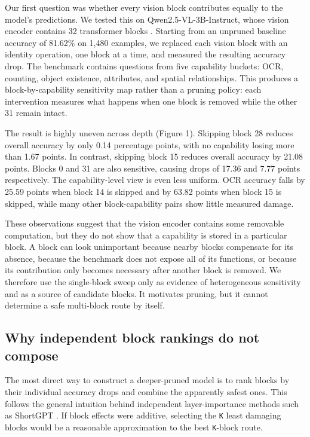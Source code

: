 \documentclass[10pt]{article}
\begin{document}
Our first question was whether every vision block contributes equally to
the model's predictions. We tested this on Qwen2.5-VL-3B-Instruct, whose
vision encoder contains 32 transformer blocks \citep{bai2025qwen25vl}.
Starting from an unpruned baseline accuracy of 81.62\% on 1,480
examples, we replaced each vision block with an identity operation, one
block at a time, and measured the resulting accuracy drop. The benchmark
contains questions from five capability buckets: OCR, counting, object
existence, attributes, and spatial relationships. This produces a
block-by-capability sensitivity map rather than a pruning policy: each
intervention measures what happens when one block is removed while the
other 31 remain intact.

The result is highly uneven across depth (Figure 1). Skipping block 28
reduces overall accuracy by only 0.14 percentage points, with no
capability losing more than 1.67 points. In contrast, skipping block 15
reduces overall accuracy by 21.08 points. Blocks 0 and 31 are also
sensitive, causing drops of 17.36 and 7.77 points respectively. The
capability-level view is even less uniform. OCR accuracy falls by 25.59
points when block 14 is skipped and by 63.82 points when block 15 is
skipped, while many other block-capability pairs show little measured
damage.

These observations suggest that the vision encoder contains some
removable computation, but they do not show that a capability is stored
in a particular block. A block can look unimportant because nearby
blocks compensate for its absence, because the benchmark does not expose
all of its functions, or because its contribution only becomes necessary
after another block is removed. We therefore use the single-block sweep
only as evidence of heterogeneous sensitivity and as a source of
candidate blocks. It motivates pruning, but it cannot determine a safe
multi-block route by itself.

\subsection{Why independent block rankings do not compose}\label{why-independent-block-rankings-do-not-compose}

The most direct way to construct a deeper-pruned model is to rank blocks
by their individual accuracy drops and combine the apparently safest
ones. This follows the general intuition behind independent
layer-importance methods such as ShortGPT \citep{men2024shortgpt}. If
block effects were additive, selecting the \texttt{K} least damaging
blocks would be a reasonable approximation to the best \texttt{K}-block
route.
\end{document}
